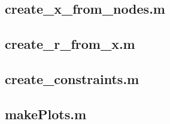 \documentclass[12pt]{article}
\begin{document}
	\subsection{create\_x\_from\_nodes.m}
	
	\subsection{create\_r\_from\_x.m}
	
	\subsection{create\_constraints.m}
	
	\subsection{makePlots.m}
	
	\fi
	
	


%



	
	
	
\end{document}

